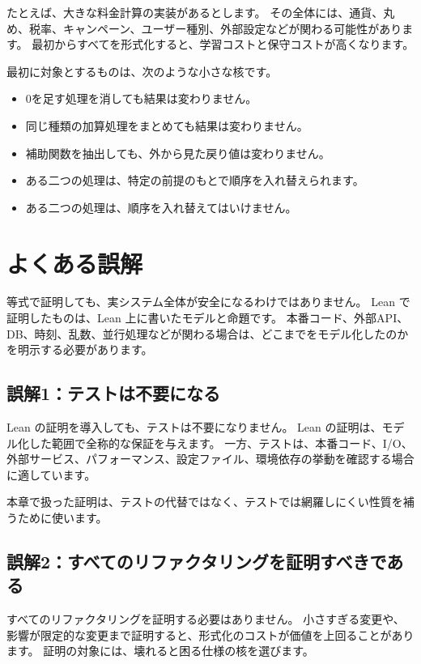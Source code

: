 たとえば、大きな料金計算の実装があるとします。
その全体には、通貨、丸め、税率、キャンペーン、ユーザー種別、外部設定などが関わる可能性があります。
最初からすべてを形式化すると、学習コストと保守コストが高くなります。

最初に対象とするものは、次のような小さな核です。

\begin{itemize}
\item 0を足す処理を消しても結果は変わりません。
\item 同じ種類の加算処理をまとめても結果は変わりません。
\item 補助関数を抽出しても、外から見た戻り値は変わりません。
\item ある二つの処理は、特定の前提のもとで順序を入れ替えられます。
\item ある二つの処理は、順序を入れ替えてはいけません。
\end{itemize}

\section{よくある誤解}

等式で証明しても、実システム全体が安全になるわけではありません。
Lean で証明したものは、Lean 上に書いたモデルと命題です。
本番コード、外部API、DB、時刻、乱数、並行処理などが関わる場合は、どこまでをモデル化したのかを明示する必要があります。

\subsection{誤解1：テストは不要になる}

Lean の証明を導入しても、テストは不要になりません。
Lean の証明は、モデル化した範囲で全称的な保証を与えます。
一方、テストは、本番コード、I/O、外部サービス、パフォーマンス、設定ファイル、環境依存の挙動を確認する場合に適しています。

本章で扱った証明は、テストの代替ではなく、テストでは網羅しにくい性質を補うために使います。

\subsection{誤解2：すべてのリファクタリングを証明すべきである}

すべてのリファクタリングを証明する必要はありません。
小さすぎる変更や、影響が限定的な変更まで証明すると、形式化のコストが価値を上回ることがあります。
証明の対象には、壊れると困る仕様の核を選びます。

